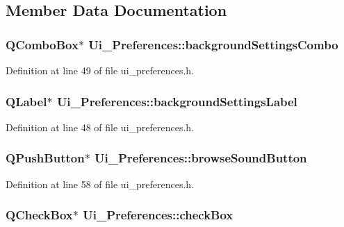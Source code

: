 \subsection{Member Data Documentation}
\hypertarget{classUi__Preferences_a129964e10a8201a42326692ea118d4d5}{
\subsubsection[{backgroundSettingsCombo}]{\setlength{\rightskip}{0pt plus 5cm}QComboBox$\ast$ {\bf Ui\_\-Preferences::backgroundSettingsCombo}}}
\label{classUi__Preferences_a129964e10a8201a42326692ea118d4d5}


Definition at line 49 of file ui\_\-preferences.h.

\hypertarget{classUi__Preferences_ab99fc5d0082778ba6c0f80e6fbf14149}{
\subsubsection[{backgroundSettingsLabel}]{\setlength{\rightskip}{0pt plus 5cm}QLabel$\ast$ {\bf Ui\_\-Preferences::backgroundSettingsLabel}}}
\label{classUi__Preferences_ab99fc5d0082778ba6c0f80e6fbf14149}


Definition at line 48 of file ui\_\-preferences.h.

\hypertarget{classUi__Preferences_a687d18226c76dca51355fac0f77f09a9}{
\subsubsection[{browseSoundButton}]{\setlength{\rightskip}{0pt plus 5cm}QPushButton$\ast$ {\bf Ui\_\-Preferences::browseSoundButton}}}
\label{classUi__Preferences_a687d18226c76dca51355fac0f77f09a9}


Definition at line 58 of file ui\_\-preferences.h.

\hypertarget{classUi__Preferences_adb394ae68ffd7dc787ff6395cab9b385}{
\subsubsection[{checkBox}]{\setlength{\rightskip}{0pt plus 5cm}QCheckBox$\ast$ {\bf Ui\_\-Preferences::checkBox}}}
\label{classUi__Preferences_adb394ae68ffd7dc787ff6395cab9b385}


